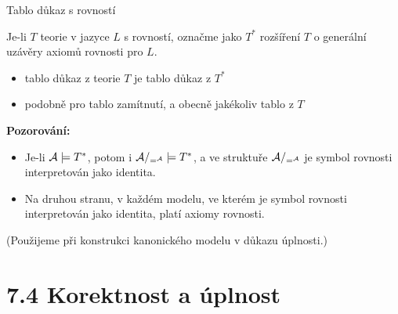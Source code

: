 \documentclass{beamer}
\begin{document}
\begin{frame}{Tablo důkaz s rovností}

    

    Je-li $T$ teorie v jazyce $L$ s rovností, označme jako $T^*$ rozšíření $T$ o generální uzávěry axiomů rovnosti pro $L$. 
    
    \begin{itemize}
        \item \alert{tablo důkaz} z teorie $T$ je \alert{tablo důkaz} z $T^*$
        \item podobně pro tablo zamítnutí, a obecně jakékoliv tablo z $T$
    \end{itemize}
 

    \textbf{Pozorování:}
    \begin{itemize}
        \item Je-li $\mathcal{A}\models T^*$, potom i $\mathcal{A}/_{=^{\mathcal{A}}}\models T^*$, a ve struktuře $\mathcal{A}/_{=^{\mathcal{A}}}$ je symbol rovnosti interpretován jako identita.
        \item Na druhou stranu, v každém modelu, ve kterém je symbol rovnosti interpretován jako identita, platí axiomy rovnosti.
    \end{itemize}
    
    
    
    (Použijeme při konstrukci \alert{kanonického modelu} v důkazu úplnosti.)

\end{frame}



\section{7.4 Korektnost a úplnost}
\end{document}

